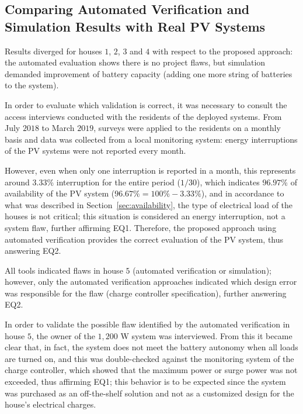 \subsection{Comparing Automated Verification and Simulation Results with Real PV Systems}

Results diverged for houses $1$, $2$, $3$ and $4$ with respect to the proposed approach: the automated evaluation shows there is no project flaws, but simulation demanded improvement of battery capacity (adding one more string of batteries to the system). 

In order to evaluate which validation is correct, it was necessary to consult the access interviews conducted with the residents of the deployed systems. From July $2018$ to March $2019$, surveys were applied to the residents on a monthly basis and data was collected from a local monitoring system: energy interruptions of the PV systems were not reported every month. 

However, even when only one interruption is reported in a month, this represents around $3.33$\% interruption for the entire period ($1/30$), which indicates $96.97$\% of availability of the PV system ($96.67\% = 100\%-3.33\%$), and in accordance to what was described in Section~\ref{sec:availability}, the type of electrical load of the houses is not critical; this situation is considered an energy interruption, not a system flaw, further affirming EQ1. Therefore, the proposed approach using automated verification provides the correct evaluation of the PV system, thus answering EQ2.

All tools indicated flaws in house $5$ (automated verification or simulation); however, only the automated verification approaches indicated which design error was responsible for the flaw (charge controller specification), further answering EQ2.

In order to validate the possible flaw identified by the automated verification in house $5$, the owner of the $1,200$ W system was interviewed. From this it became clear that, in fact, the system does not meet the battery autonomy when all loads are turned on, and this was double-checked against the monitoring system of the charge controller, which showed that the maximum power or surge power was not exceeded, thus affirming EQ1; this behavior is to be expected since the system was purchased as an off-the-shelf solution and not as a customized design for the house's electrical charges. 

%
